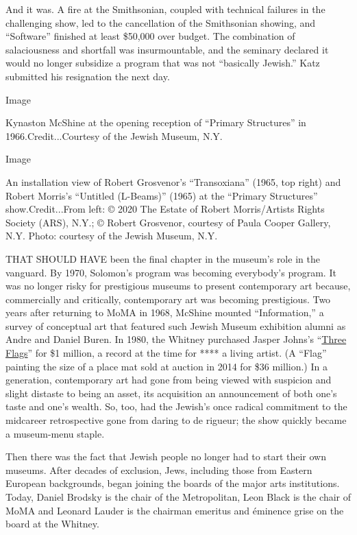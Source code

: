 And it was. A fire at the Smithsonian, coupled with technical failures
in the challenging show, led to the cancellation of the Smithsonian
showing, and ``Software'' finished at least \$50,000 over budget. The
combination of salaciousness and shortfall was insurmountable, and the
seminary declared it would no longer subsidize a program that was not
``basically Jewish.'' Katz submitted his resignation the next day.

Image

Kynaston McShine at the opening reception of ``Primary Structures'' in
1966.Credit...Courtesy of the Jewish Museum, N.Y.

Image

An installation view of Robert Grosvenor's ``Transoxiana'' (1965, top
right) and Robert Morris's ``Untitled (L-Beams)'' (1965) at the
``Primary Structures'' show.Credit...From left: © 2020 The Estate of
Robert Morris/Artists Rights Society (ARS), N.Y.; © Robert Grosvenor,
courtesy of Paula Cooper Gallery, N.Y. Photo: courtesy of the Jewish
Museum, N.Y.

THAT SHOULD HAVE been the final chapter in the museum's role in the
vanguard. By 1970, Solomon's program was becoming everybody's program.
It was no longer risky for prestigious museums to present contemporary
art because, commercially and critically, contemporary art was becoming
prestigious. Two years after returning to MoMA in 1968, McShine mounted
``Information,'' a survey of conceptual art that featured such Jewish
Museum exhibition alumni as Andre and Daniel Buren. In 1980, the Whitney
purchased Jasper Johns's
``\href{https://whitney.org/collection/works/1060}{Three Flags}'' for
\$1 million, a record at the time for **** a living artist. (A ``Flag''
painting the size of a place mat sold at auction in 2014 for \$36
million.) In a generation, contemporary art had gone from being viewed
with suspicion and slight distaste to being an asset, its acquisition an
announcement of both one's taste and one's wealth. So, too, had the
Jewish's once radical commitment to the midcareer retrospective gone
from daring to de rigueur; the show quickly became a museum-menu staple.

Then there was the fact that Jewish people no longer had to start their
own museums. After decades of exclusion, Jews, including those from
Eastern European backgrounds, began joining the boards of the major arts
institutions. Today, Daniel Brodsky is the chair of the Metropolitan,
Leon Black is the chair of MoMA and Leonard Lauder is the chairman
emeritus and éminence grise on the board at the Whitney.

